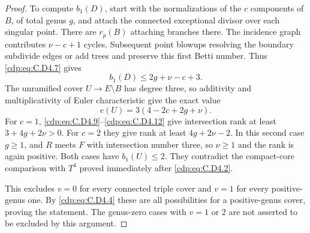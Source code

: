 \begin{proof}
To compute $b_1(D)$, start with the normalizations of the
$c$ components of $B$, of total genus $g$, and attach the
connected exceptional divisor over each singular point.
There are $r_p(B)$ attaching branches there. The incidence
graph contributes $\nu-c+1$ cycles. Subsequent point
blowups resolving the boundary subdivide edges or add trees
and preserve this first Betti number. Thus \eqref{cdp:eq:C.D4.7} gives
\[
                         b_1(D)\le2g+\nu-c+3.
\tag{C.D4.11}\label{cdp:eq:C.D4.11}
\]
The unramified cover $U\to E\setminus B$ has degree three,
so additivity and multiplicativity of Euler characteristic
give the exact value
\[
                         e(U)=3(4-2c+2g+\nu).
\tag{C.D4.12}\label{cdp:eq:C.D4.12}
\]
For $c=1$, \eqref{cdp:eq:C.D4.9}--\eqref{cdp:eq:C.D4.12} give intersection rank at
least $3+4g+2\nu>0$. For $c=2$ they give rank at least
$4g+2\nu-2$. In this second case $g\ge1$, and $R$ meets
$F$ with intersection number three, so $\nu\ge1$ and the
rank is again positive. Both cases have $b_1(U)\le2$.
They contradict the compact-core comparison with $T^4$
proved immediately after \eqref{cdp:eq:C.D4.2}.

This excludes $v=0$ for every connected triple cover and
$v=1$ for every positive-genus one. By \eqref{cdp:eq:C.D4.4} these are
all possibilities for a positive-genus cover, proving the
statement. The genus-zero cases with $v=1$ or $2$ are not
asserted to be excluded by this argument.
\end{proof}


